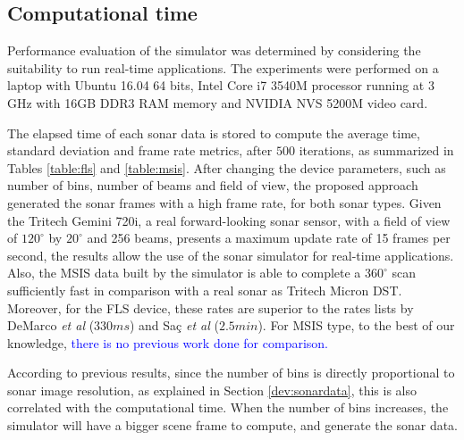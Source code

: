 \documentclass[final,5p,times]{elsarticle}
\begin{document}
\subsection{Computational time}

Performance evaluation of the simulator was determined by considering the
suitability to run real-time applications. The experiments were performed
on a laptop with Ubuntu 16.04 64 bits, Intel Core i7 3540M processor
running at 3 GHz with 16GB DDR3 RAM memory and NVIDIA NVS 5200M video card.

The elapsed time of each sonar data is stored to compute the average time,
standard deviation and frame rate metrics, after $500$ iterations, as
summarized in Tables \ref{table:fls} and \ref{table:msis}. After changing
the device parameters, such as number of bins, number of beams and field
of view, the proposed approach generated the sonar frames with a high
frame rate, for both sonar types. Given the Tritech Gemini 720i, a real
forward-looking sonar sensor, with a field of view of $120^{\circ}$ by
$20^{\circ}$ and 256 beams, presents a maximum update rate of 15 frames
per second, the results allow the use of the sonar simulator for real-time
applications. Also, the MSIS data built by the simulator is able to
complete a $360^{\circ}$ scan sufficiently fast in comparison with a
real sonar as Tritech Micron DST. Moreover, for the FLS device, these
rates are superior to the rates lists by DeMarco \textit{et al}
\cite{demarco2015} ($330 ms$) and Saç \textit{et al} \cite{sac2015}
($2.5 min$). For MSIS type, to the best of our knowledge, \textcolor{blue}{there is no
previous work done for comparison.}

According to previous results, since the number of bins is directly
proportional to sonar image resolution, as explained in Section
\ref{dev:sonardata}, this is also correlated with the computational time.
When the number of bins increases, the simulator will have a bigger scene
frame to compute, and generate the sonar data.
\end{document}
